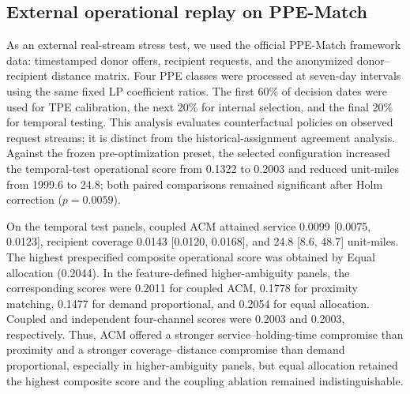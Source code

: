 \subsection{External operational replay on PPE-Match}

As an external real-stream stress test, we used the official PPE-Match framework data: timestamped donor offers, recipient requests, and the anonymized donor--recipient distance matrix. Four PPE classes were processed at seven-day intervals using the same fixed LP coefficient ratios. The first 60\% of decision dates were used for TPE calibration, the next 20\% for internal selection, and the final 20\% for temporal testing. This analysis evaluates counterfactual policies on observed request streams; it is distinct from the historical-assignment agreement analysis. Against the frozen pre-optimization preset, the selected configuration increased the temporal-test operational score from 0.1322 to 0.2003 and reduced unit-miles from 1999.6 to 24.8; both paired comparisons remained significant after Holm correction ($p=0.0059$).

On the temporal test panels, coupled ACM attained service 0.0099 [0.0075, 0.0123], recipient coverage 0.0143 [0.0120, 0.0168], and 24.8 [8.6, 48.7] unit-miles. The highest prespecified composite operational score was obtained by Equal allocation (0.2044). In the feature-defined higher-ambiguity panels, the corresponding scores were 0.2011 for coupled ACM, 0.1778 for proximity matching, 0.1477 for demand proportional, and 0.2054 for equal allocation. Coupled and independent four-channel scores were 0.2003 and 0.2003, respectively. Thus, ACM offered a stronger service--holding-time compromise than proximity and a stronger coverage--distance compromise than demand proportional, especially in higher-ambiguity panels, but equal allocation retained the highest composite score and the coupling ablation remained indistinguishable.
